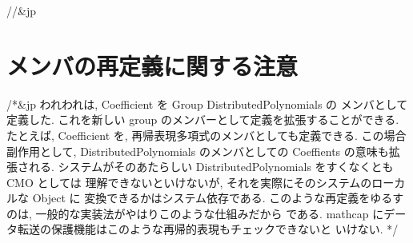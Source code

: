 //&jp \section{メンバの再定義に関する注意}

/*&jp
われわれは,
Coefficient を Group DistributedPolynomials の メンバとして定義した.
これを新しい group のメンバーとして定義を拡張することができる.
たとえば, Coefficient を, 再帰表現多項式のメンバとしても定義できる.
この場合副作用として, DistributedPolynomials のメンバとしての Coeffients
の意味も拡張される.
システムがそのあたらしい DistributedPolynomials をすくなくとも CMO としては
理解できないといけないが, それを実際にそのシステムのローカルな Object に
変換できるかはシステム依存である.
このような再定義をゆるすのは, 一般的な実装法がやはりこのような仕組みだから
である.
mathcap にデータ転送の保護機能はこのような再帰的表現もチェックできないと
いけない.
*/
